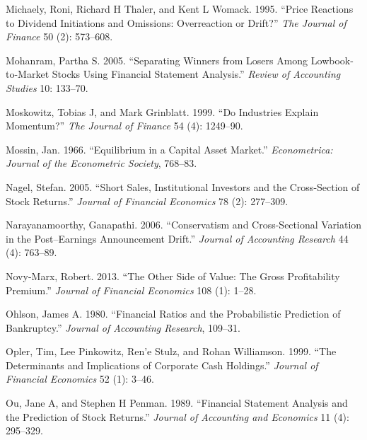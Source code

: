 \documentclass[
  letterpaper,
  DIV=11,
  numbers=noendperiod]{scrreprt}
\newlength{\cslhangindent}
\newlength{\cslentryspacingunit} %
\newenvironment{CSLReferences}[2] %
 {%
  \setlength{\parindent}{0pt}
  \ifodd #1
  \let\oldpar\par
  \def\par{\hangindent=\cslhangindent\oldpar}
  \fi
  \setlength{\parskip}{#2\cslentryspacingunit}
 }%
 {}
\begin{document}
\begin{CSLReferences}{1}{0}
\leavevmode{}%
Michaely, Roni, Richard H Thaler, and Kent L Womack. 1995. {``Price
Reactions to Dividend Initiations and Omissions: Overreaction or
Drift?''} \emph{The Journal of Finance} 50 (2): 573--608.

\leavevmode{}%
Mohanram, Partha S. 2005. {``Separating Winners from Losers Among
Lowbook-to-Market Stocks Using Financial Statement Analysis.''}
\emph{Review of Accounting Studies} 10: 133--70.

\leavevmode{}%
Moskowitz, Tobias J, and Mark Grinblatt. 1999. {``Do Industries Explain
Momentum?''} \emph{The Journal of Finance} 54 (4): 1249--90.

\leavevmode{}%
Mossin, Jan. 1966. {``Equilibrium in a Capital Asset Market.''}
\emph{Econometrica: Journal of the Econometric Society}, 768--83.

\leavevmode{}%
Nagel, Stefan. 2005. {``Short Sales, Institutional Investors and the
Cross-Section of Stock Returns.''} \emph{Journal of Financial Economics}
78 (2): 277--309.

\leavevmode{}%
Narayanamoorthy, Ganapathi. 2006. {``Conservatism and Cross-Sectional
Variation in the Post--Earnings Announcement Drift.''} \emph{Journal of
Accounting Research} 44 (4): 763--89.

\leavevmode{}%
Novy-Marx, Robert. 2013. {``The Other Side of Value: The Gross
Profitability Premium.''} \emph{Journal of Financial Economics} 108 (1):
1--28.

\leavevmode{}%
Ohlson, James A. 1980. {``Financial Ratios and the Probabilistic
Prediction of Bankruptcy.''} \emph{Journal of Accounting Research},
109--31.

\leavevmode{}%
Opler, Tim, Lee Pinkowitz, Ren'e Stulz, and Rohan Williamson. 1999.
{``The Determinants and Implications of Corporate Cash Holdings.''}
\emph{Journal of Financial Economics} 52 (1): 3--46.

\leavevmode{}%
Ou, Jane A, and Stephen H Penman. 1989. {``Financial Statement Analysis
and the Prediction of Stock Returns.''} \emph{Journal of Accounting and
Economics} 11 (4): 295--329.


\end{CSLReferences}
\end{document}
